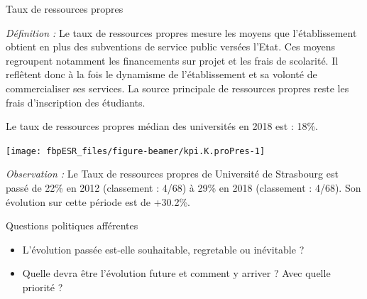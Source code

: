 \documentclass[
  8pt,
  french,
  ignorenonframetext,
  landscape]{beamer}
\providecommand{\tightlist}{%
  \setlength{\itemsep}{0pt}\setlength{\parskip}{0pt}}
\begin{document}
\begin{frame}{Taux de ressources propres}
\protect\hypertarget{taux-de-ressources-propres}{}

\begin{footnotesize}

\emph{Définition :} Le taux de ressources propres mesure les moyens que
l'établissement obtient en plus des subventions de service public
versées l'Etat. Ces moyens regroupent notamment les financements sur
projet et les frais de scolarité. Il reflêtent donc à la fois le
dynamisme de l'établissement et sa volonté de commercialiser ses
services. La source principale de ressources propres reste les frais
d'inscription des étudiants.

\end{footnotesize}

Le taux de ressources propres médian des universités en 2018 est : 18\%.

\begin{center}\texttt{[image: fbpESR\_files/figure-beamer/kpi.K.proPres-1]} \end{center}

\emph{Observation :} Le Taux de ressources propres de Université de
Strasbourg est passé de 22\% en 2012 (classement : 4/68) à 29\% en 2018
(classement : 4/68). Son évolution sur cette période est de +30.2\%.

\begin{block}{Questions politiques afférentes}

\begin{itemize}
\tightlist
\item
  L'évolution passée est-elle souhaitable, regretable ou inévitable ?
\item
  Quelle devra être l'évolution future et comment y arriver ? Avec
  quelle priorité ?
\end{itemize}

\end{block}

\end{frame}
\end{document}
